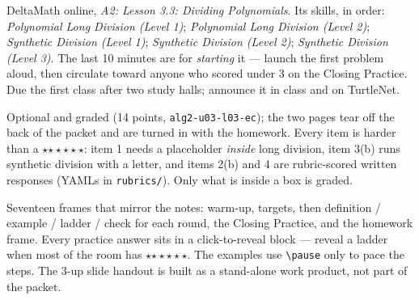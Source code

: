 \documentclass[10pt]{article}
\newcommand{\rung}[1]{{\color{goldacc}\ifcase#1\or$\star$\or$\star\star$\or$\star\star\star$\fi}}
\begin{document}
\boxguard[10]
\begin{teachernote}[Homework]
DeltaMath online, \emph{A2: Lesson 3.3: Dividing Polynomials}. Its skills, in order: \emph{Polynomial Long Division (Level 1)}; \emph{Polynomial Long Division (Level 2)}; \emph{Synthetic Division (Level 1)}; \emph{Synthetic Division (Level 2)}; \emph{Synthetic Division (Level 3)}. The last 10 minutes are for \emph{starting} it --- launch the first problem aloud, then
circulate toward anyone who scored under 3 on the Closing Practice. Due the first class after two
study halls; announce it in class and on TurtleNet.
\end{teachernote}

\boxguard[10]
\begin{teachernote}
Optional and graded (14 points, \texttt{alg2-u03-l03-ec}); the two pages tear off the back of the
packet and are turned in with the homework. Every item is harder than a \rung3: item 1 needs a
placeholder \emph{inside} long division, item 3(b) runs synthetic division with a letter, and
items 2(b) and 4 are rubric-scored written responses (YAMLs in \texttt{rubrics/}). Only what is
inside a box is graded.
\end{teachernote}

\boxguard[10]
\begin{teachernote}[Slides]
Seventeen frames that mirror the notes: warm-up, targets, then definition / example / ladder /
check for each round, the Closing Practice, and the homework frame. Every practice answer sits in
a click-to-reveal block --- reveal a ladder when most of the room has \rung2. The examples use
\verb|\pause| only to pace the steps. The 3-up slide handout is built as a stand-alone work
product, not part of the packet.
\end{teachernote}
\end{document}
